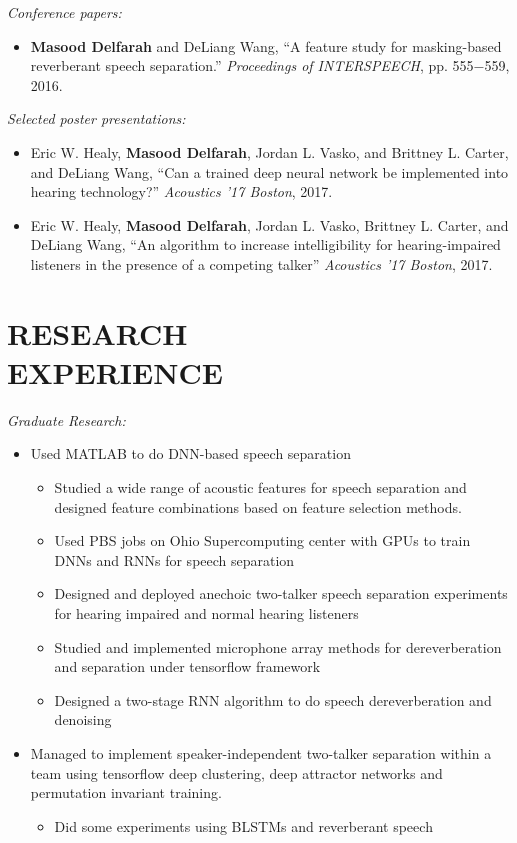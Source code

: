 \documentclass[margin, 10pt]{res}
\begin{document}
\begin{resume}
\textit{Conference papers:}
\begin{itemize}
\item \textbf{Masood Delfarah} and DeLiang Wang, ``A feature study for masking-based reverberant speech separation.'' \textit{Proceedings of INTERSPEECH}, pp. 555$-$559, 2016.
\end{itemize}

\textit{Selected poster presentations:}
\begin{itemize}
\item Eric W. Healy, \textbf{Masood Delfarah}, Jordan L. Vasko, and Brittney L. Carter, and DeLiang Wang, ``Can a trained deep neural network be implemented into hearing technology?'' \textit{Acoustics '17 Boston}, 2017.
\item Eric W. Healy, \textbf{Masood Delfarah}, Jordan L. Vasko, Brittney L. Carter, and DeLiang Wang, ``An algorithm to increase intelligibility for hearing-impaired listeners in the presence of a competing talker'' \textit{Acoustics '17 Boston}, 2017.
\end{itemize}

\section{RESEARCH \\ EXPERIENCE}
\textit{Graduate Research:}
\begin{itemize}
\item Used MATLAB to do DNN-based speech separation
	\begin{itemize}
	\item Studied a wide range of acoustic features for speech separation and designed feature combinations based on feature selection methods.
	\item Used PBS jobs on Ohio Supercomputing center with GPUs to train DNNs and RNNs for speech separation
	\item Designed and deployed anechoic two-talker speech separation experiments for hearing impaired and normal hearing listeners
	\item Studied and implemented microphone array methods for dereverberation and separation under tensorflow framework
	\item Designed a two-stage RNN algorithm to do speech dereverberation and denoising
	\end{itemize}

\item Managed to implement speaker-independent two-talker separation within a team using tensorflow deep clustering, deep attractor networks and permutation invariant training.
	\begin{itemize}
	\item Did some experiments using BLSTMs and reverberant speech
	\end{itemize}


\end{itemize}
\end{resume}
\end{document}
